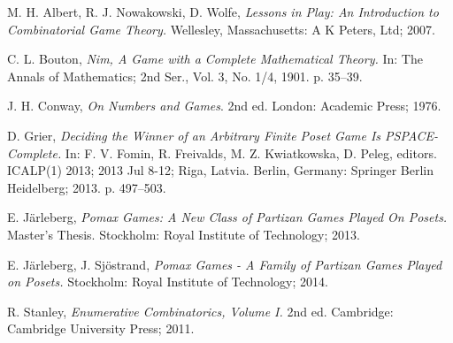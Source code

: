 \begin{thebibliography}{9}

 M. H. Albert, R. J. Nowakowski, D. Wolfe,
 \emph{Lessons in Play: An Introduction to Combinatorial Game Theory.}
 Wellesley, Massachusetts:
 A K Peters, Ltd;
 2007.
  
  C. L. Bouton, 
  \emph{Nim, A Game with a Complete Mathematical Theory.} 
  In: The Annals of Mathematics;
  2nd Ser., Vol. 3, No. 1/4,
  1901.
  p. 35–39.

  J. H. Conway,
  \emph{On Numbers and Games}.
  2nd ed.
  London:
  Academic Press;
  1976.
  
  D. Grier, 
  \emph{Deciding the Winner of an Arbitrary Finite Poset Game Is PSPACE-Complete.} 
  In: F. V. Fomin, R. Freivalds, M. Z. Kwiatkowska, D. Peleg, editors. 
  ICALP(1) 2013;
  2013 Jul 8-12;
  Riga, Latvia.
  Berlin, Germany: 
  Springer Berlin Heidelberg;
  2013. 
  p. 497–503.


 E. J\"arleberg,
 \emph{Pomax Games: A New Class of Partizan Games Played On Posets.}
 Master’s Thesis.
 Stockholm:
 Royal Institute of Technology;
 2013.

 E. J\"arleberg, J. Sj\"ostrand,
 \emph{Pomax Games - A Family of Partizan Games Played on Posets.}
 Stockholm:
 Royal Institute of Technology;
 2014.

 R. Stanley,
 \emph{Enumerative Combinatorics, Volume I.}
 2nd ed. 
 Cambridge:
 Cambridge University Press; 
 2011.




\end{thebibliography}


